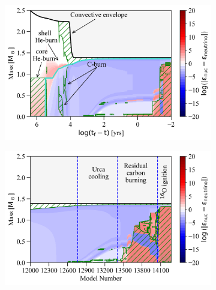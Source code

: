 \documentclass[main.tex]{subfiles}
\begin{document}
\begin{figure}[h!]
    \centering
    \begin{subfigure}{.5\textwidth}
        \centering
        \includegraphics[width=0.95\columnwidth]{figures/chapter2/kipp/series1_rt_2p5M_z0p02_f0.png}
    \end{subfigure}\hfill
    \begin{subfigure}{.5\textwidth}
        \centering
        \includegraphics[width=0.95\columnwidth]{figures/chapter2/kipp/vs_model_number/series1_mn_2p5M_z0p02_f0.png}
    \end{subfigure}\hfill
    

\end{figure}
\end{document}
